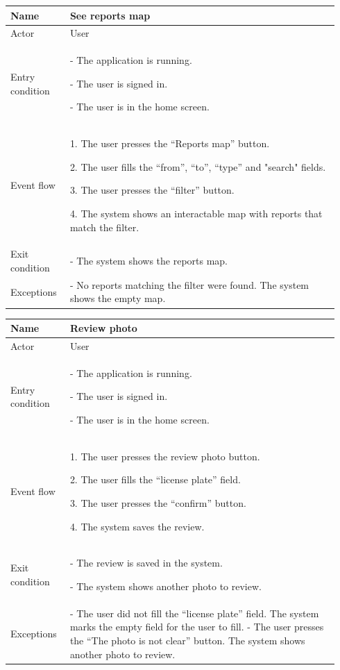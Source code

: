 \begin{table}[H]
\begin{tabular}{|p{0.17\linewidth}|p{0.77\linewidth}|}
\hline
Name            & See reports map
\\ \hline

Actor           & User
\\ \hline

Entry condition &
    - The application is running.

    - The user is signed in.

    - The user is in the home screen.
\\ \hline
Event flow      & 
    1. The user presses the “Reports map” button.

    2. The user fills the “from”, “to”, “type” and "search" fields.

    3. The user presses the “filter” button.

    4. The system shows an interactable map with reports that match the filter.
\\ \hline
Exit condition  & 
    - The system shows the reports map.
\\ \hline
Exceptions      &
    - No reports matching the filter were found. The system shows the empty map.
\\ \hline
\end{tabular}
\end{table}

\begin{table}[H]
\begin{tabular}{|p{0.17\linewidth}|p{0.77\linewidth}|}
\hline
Name            & Review photo
\\ \hline

Actor           & User
\\ \hline

Entry condition &
    - The application is running.

    - The user is signed in.

    - The user is in the home screen.
\\ \hline
Event flow      & 
    1. The user presses the review photo button.

    2. The user fills the “license plate” field.

    3. The user presses the “confirm” button.

    4. The system saves the review.
\\ \hline
Exit condition  & 
    - The review is saved in the system.

    - The system shows another photo to review.
\\ \hline
Exceptions      &
    - The user did not fill the “license plate” field. The system marks the empty field for the user to fill.
    - The user presses the “The photo is not clear” button. The system shows another photo to review.
\\ \hline
\end{tabular}
\end{table}

